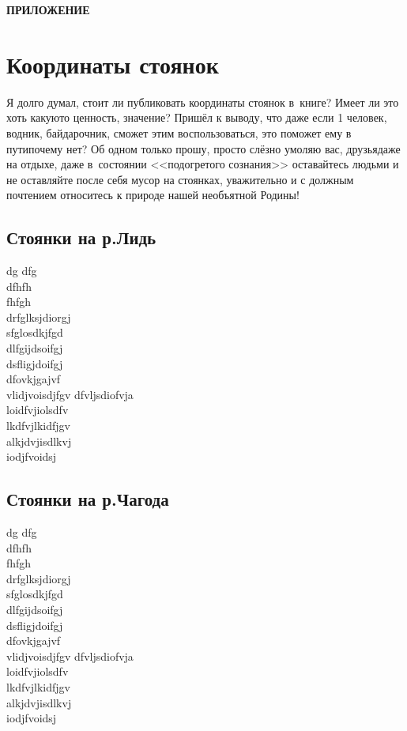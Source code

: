 \newpage
\appendix
\pagestyle{empty}
{\hfill\large\textbf{ПРИЛОЖЕНИЕ}}
\section*{Координаты стоянок}
Я долго думал, стоит ли публиковать координаты стоянок в~книге? Имеет ли это хоть какую\sdash то ценность, значение? Пришёл к выводу, что даже если 1 человек, водник, байдарочник, сможет этим воспользоваться, это поможет ему в пути\mdash почему нет? Об одном только прошу, просто слёзно умоляю вас, друзья\mdash даже на отдыхе, даже в~состоянии <<подогретого сознания>> оставайтесь людьми и не оставляйте после себя мусор на стоянках, уважительно и с должным почтением относитесь к природе нашей необъятной Родины!  
 
\subsection*{Стоянки на р.Лидь}
dg dfg\\
dfhfh\\
fhfgh\\
drfglksjdiorgj\\
sfglosdkjfgd\\
dlfgijdsoifgj\\
dsfligjdoifgj\\
dfovkjgajvf\\
vlidjvoisdjfgv
dfvljsdiofvja\\
loidfvjiolsdfv\\
lkdfvjlkidfjgv\\
alkjdvjisdlkvj\\
iodjfvoidsj\\

\subsection*{Стоянки на р.Чагода}
dg dfg\\
dfhfh\\
fhfgh\\
drfglksjdiorgj\\
sfglosdkjfgd\\
dlfgijdsoifgj\\
dsfligjdoifgj\\
dfovkjgajvf\\
vlidjvoisdjfgv
dfvljsdiofvja\\
loidfvjiolsdfv\\
lkdfvjlkidfjgv\\
alkjdvjisdlkvj\\
iodjfvoidsj\\

